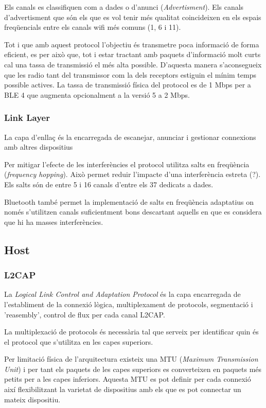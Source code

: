 Els canals es classifiquen com a dades o d'anunci (\textit{Advertisment}). Els canals d'advertisment que són els que es vol tenir més qualitat coincideixen en els espais freqüencials entre els canals wifi més comuns (1, 6 i 11).

Tot i que amb aquest protocol l'objectiu és transmetre poca informació de forma eficient, es per això que, tot i estar tractant amb paquets d'informació molt curts cal una tassa de transmissió el més alta possible. D'aquesta manera s'aconsegueix que les radio tant del transmissor com la dels receptors estiguin el mínim temps possible actives.
La tassa de transmissió física del protocol es de 1 Mbps per a BLE 4 que augmenta opcionalment a la versió 5 a 2 Mbps.


\subsubsection{Link Layer}

La capa d'enllaç és la encarregada de escanejar, anunciar i gestionar connexions amb altres dispositius

Per mitigar l'efecte de les interferències el protocol utilitza salts en freqüència (\textit{frequency hopping}). Això permet reduir l'impacte d'una interferència estreta (?). Els salts són de entre 5 i 16 canals d'entre els 37 dedicats a dades.

Bluetooth també permet la implementació de salts en freqüència adaptatius on només s'utilitzen canals suficientment bons descartant aquells en que es considera que hi ha masses interferències.

\subsection{Host}
\subsubsection{L2CAP}
La \textit{Logical Link Control and Adaptation Protocol} és la capa encarregada de l'establiment de la connexió lògica, multiplexament de protocols, segmentació i 'reasembly', control de flux per cada canal L2CAP.

La multiplexació de protocols és necessària tal que serveix per identificar quin és el protocol que s'utilitza en les capes superiors.

Per limitació física de l'arquitectura existeix una MTU (\textit{Maximum Transmission Unit}) i per tant els paquets de les capes superiors es converteixen en paquets més petits per a les capes inferiors.
Aquesta MTU es pot definir per cada connexió així flexibilitzant la varietat de dispositius amb els que es pot connectar un mateix dispositiu.

